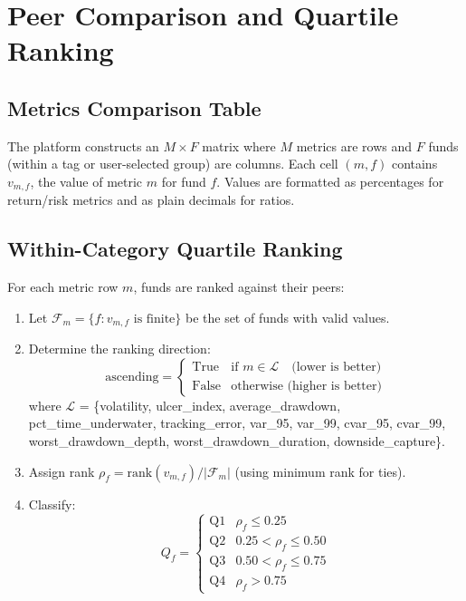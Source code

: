 \documentclass[12pt, a4paper]{article}
\begin{document}
\section{Peer Comparison and Quartile Ranking}

\subsection{Metrics Comparison Table}

The platform constructs an $M \times F$ matrix where $M$ metrics are
rows and $F$ funds (within a tag or user-selected group) are columns.
Each cell $(m, f)$ contains $v_{m,f}$, the value of metric $m$ for fund
$f$.  Values are formatted as percentages for return/risk metrics and
as plain decimals for ratios.

\subsection{Within-Category Quartile Ranking}

For each metric row $m$, funds are ranked against their peers:

\begin{enumerate}[label=\arabic*.]
  \item Let $\mathcal{F}_m = \{f : v_{m,f} \text{ is finite}\}$ be the
    set of funds with valid values.
  \item Determine the ranking direction:
    \[
      \text{ascending} =
      \begin{cases}
        \text{True} & \text{if } m \in \mathcal{L} \quad \text{(lower is better)} \\
        \text{False} & \text{otherwise (higher is better)}
      \end{cases}
    \]
    where $\mathcal{L}$ = \{volatility, ulcer\_index, average\_drawdown,
    pct\_time\_underwater, tracking\_error, var\_95, var\_99, cvar\_95,
    cvar\_99, worst\_drawdown\_depth, worst\_drawdown\_duration,
    downside\_capture\}.
  \item Assign rank $\rho_f = \text{rank}(v_{m,f}) / |\mathcal{F}_m|$
    (using minimum rank for ties).
  \item Classify:
    \[
      Q_f =
      \begin{cases}
        \text{Q1} & \rho_f \leq 0.25 \\
        \text{Q2} & 0.25 < \rho_f \leq 0.50 \\
        \text{Q3} & 0.50 < \rho_f \leq 0.75 \\
        \text{Q4} & \rho_f > 0.75
      \end{cases}
    \]
\end{enumerate}
\end{document}
